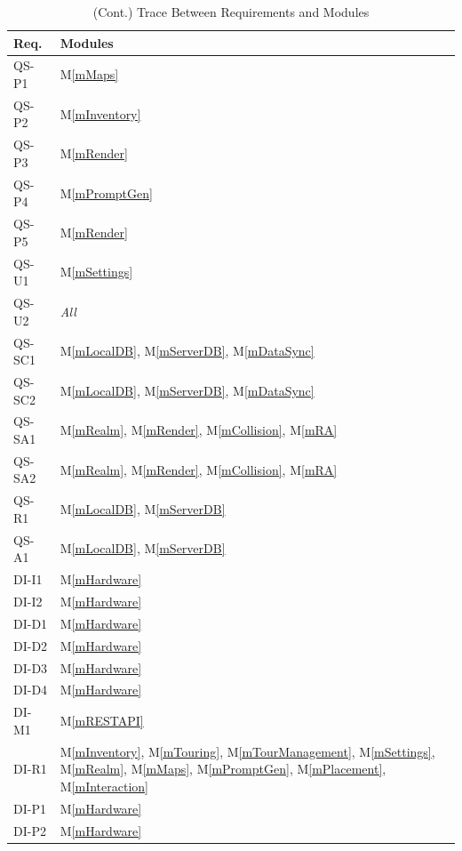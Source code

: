 \documentclass[12pt, titlepage]{article}
\newcommand{\mref}[1]{M\ref{#1}}
\begin{document}
\begin{table}[H]
\centering
\begin{tabular}{p{} p{}}
\toprule
\textbf{Req.} & \textbf{Modules}\\
\midrule
QS-P1 & \mref{mMaps}\\
QS-P2 & \mref{mInventory}\\
QS-P3 & \mref{mRender}\\
QS-P4 & \mref{mPromptGen}\\
QS-P5 & \mref{mRender}\\
QS-U1 & \mref{mSettings}\\
QS-U2 & \textit{All}\\
QS-SC1 & \mref{mLocalDB}, \mref{mServerDB}, \mref{mDataSync}\\
QS-SC2 & \mref{mLocalDB}, \mref{mServerDB}, \mref{mDataSync}\\
QS-SA1 & \mref{mRealm}, \mref{mRender}, \mref{mCollision}, \mref{mRA}\\
QS-SA2 & \mref{mRealm}, \mref{mRender}, \mref{mCollision}, \mref{mRA}\\
QS-R1 & \mref{mLocalDB}, \mref{mServerDB}\\
QS-A1 & \mref{mLocalDB}, \mref{mServerDB}\\
DI-I1 & \mref{mHardware}\\
DI-I2 & \mref{mHardware}\\
DI-D1 & \mref{mHardware}\\
DI-D2 & \mref{mHardware}\\
DI-D3 & \mref{mHardware}\\
DI-D4 & \mref{mHardware}\\
DI-M1 & \mref{mRESTAPI}\\
DI-R1 & \mref{mInventory}, \mref{mTouring}, \mref{mTourManagement}, \mref{mSettings}, \mref{mRealm}, \mref{mMaps}, \mref{mPromptGen}, \mref{mPlacement}, \mref{mInteraction}\\
DI-P1 & \mref{mHardware}\\
DI-P2 & \mref{mHardware}\\
\bottomrule
\end{tabular}
\caption{(Cont.) Trace Between Requirements and Modules}
\label{TblRT}
\end{table}
\end{document}
